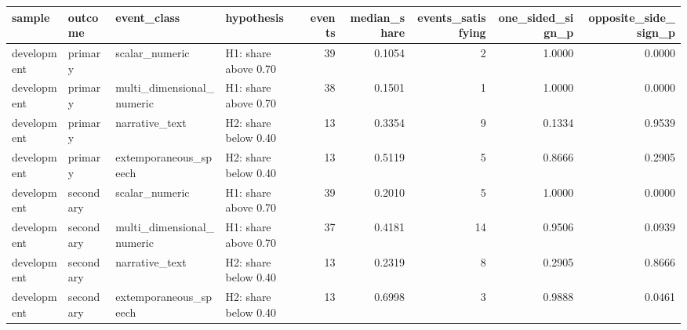 \begin{tabular}{llllrrrrr}
\toprule
sample & outcome & event_class & hypothesis & events & median_share & events_satisfying & one_sided_sign_p & opposite_side_sign_p \\
\midrule
development & primary & scalar_numeric & H1: share above 0.70 & 39 & 0.1054 & 2 & 1.0000 & 0.0000 \\
development & primary & multi_dimensional_numeric & H1: share above 0.70 & 38 & 0.1501 & 1 & 1.0000 & 0.0000 \\
development & primary & narrative_text & H2: share below 0.40 & 13 & 0.3354 & 9 & 0.1334 & 0.9539 \\
development & primary & extemporaneous_speech & H2: share below 0.40 & 13 & 0.5119 & 5 & 0.8666 & 0.2905 \\
development & secondary & scalar_numeric & H1: share above 0.70 & 39 & 0.2010 & 5 & 1.0000 & 0.0000 \\
development & secondary & multi_dimensional_numeric & H1: share above 0.70 & 37 & 0.4181 & 14 & 0.9506 & 0.0939 \\
development & secondary & narrative_text & H2: share below 0.40 & 13 & 0.2319 & 8 & 0.2905 & 0.8666 \\
development & secondary & extemporaneous_speech & H2: share below 0.40 & 13 & 0.6998 & 3 & 0.9888 & 0.0461 \\
\bottomrule
\end{tabular}
